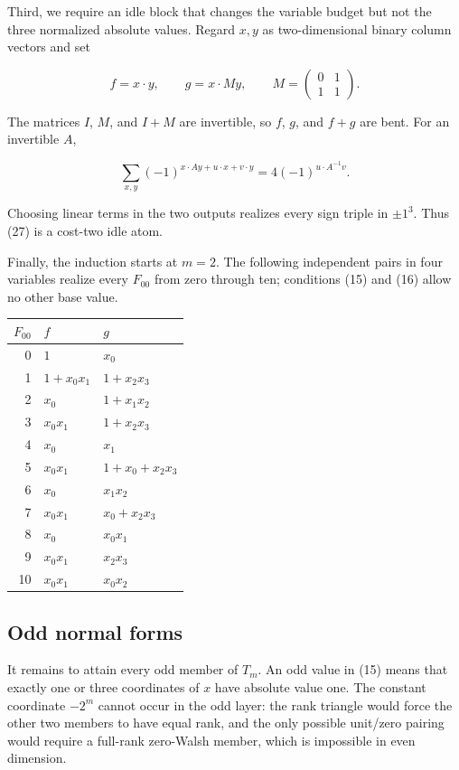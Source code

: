 \documentclass[11pt]{article}
\theoremstyle{remark}
\begin{document}
Third, we require an idle block that changes the variable budget but not the three normalized absolute values. Regard $x,y$ as two-dimensional binary column vectors and set

\[
f=x\cdot y,
\qquad
g=x\cdot My,
\qquad
M=\begin{pmatrix}0&1\\1&1\end{pmatrix}.
\tag{27}
\]

The matrices $I$, $M$, and $I+M$ are invertible, so $f$, $g$, and $f+g$ are bent. For an invertible $A$,

\[
\sum_{x,y}(-1)^{x\cdot Ay+u\cdot x+v\cdot y}
=4(-1)^{u\cdot A^{-1}v}.
\tag{28}
\]

Choosing linear terms in the two outputs realizes every sign triple in ${\pm 1}^3$. Thus (27) is a cost-two idle atom.

Finally, the induction starts at $m=2$. The following independent pairs in four variables realize every $F_{00}$ from zero through ten; conditions (15) and (16) allow no other base value.

\begin{center}
\small
\begin{tabular}{@{}r p{} p{}@{}}
\toprule
$F_{00}$ & $f$ & $g$ \\
\midrule
0 & $1$ & $x_0$ \\
1 & $1+x_0x_1$ & $1+x_2x_3$ \\
2 & $x_0$ & $1+x_1x_2$ \\
3 & $x_0x_1$ & $1+x_2x_3$ \\
4 & $x_0$ & $x_1$ \\
5 & $x_0x_1$ & $1+x_0+x_2x_3$ \\
6 & $x_0$ & $x_1x_2$ \\
7 & $x_0x_1$ & $x_0+x_2x_3$ \\
8 & $x_0$ & $x_0x_1$ \\
9 & $x_0x_1$ & $x_2x_3$ \\
10 & $x_0x_1$ & $x_0x_2$ \\
\bottomrule
\end{tabular}
\end{center}

\subsection{Odd normal forms}

It remains to attain every odd member of $T_m$. An odd value in (15) means that exactly one or three coordinates of $x$ have absolute value one. The constant coordinate $-2^m$ cannot occur in the odd layer: the rank triangle would force the other two members to have equal rank, and the only possible unit/zero pairing would require a full-rank zero-Walsh member, which is impossible in even dimension.
\end{document}
